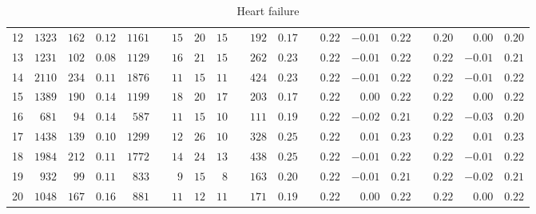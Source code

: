 \documentclass[]{article}\usepackage[]{graphicx}\usepackage[]{color}
\begin{document}
\begin{landscape}
\begin{table}[!tbp]
\begin{center}
\begin{tabular}{lrrrrcrrrcrrcrrrcrrr}
12&$1323$&$162$&$0.12$&$1161$&&$15$&$20$&$15$&&$192$&$0.17$&&$0.22$&$-0.01$&$0.22$&&$0.20$&$ 0.00$&$0.20$\tabularnewline
13&$1231$&$102$&$0.08$&$1129$&&$16$&$21$&$15$&&$262$&$0.23$&&$0.22$&$-0.01$&$0.22$&&$0.22$&$-0.01$&$0.21$\tabularnewline
14&$2110$&$234$&$0.11$&$1876$&&$11$&$15$&$11$&&$424$&$0.23$&&$0.22$&$-0.01$&$0.22$&&$0.22$&$-0.01$&$0.22$\tabularnewline
15&$1389$&$190$&$0.14$&$1199$&&$18$&$20$&$17$&&$203$&$0.17$&&$0.22$&$ 0.00$&$0.22$&&$0.22$&$ 0.00$&$0.22$\tabularnewline
16&$ 681$&$ 94$&$0.14$&$ 587$&&$11$&$15$&$10$&&$111$&$0.19$&&$0.22$&$-0.02$&$0.21$&&$0.22$&$-0.03$&$0.20$\tabularnewline
17&$1438$&$139$&$0.10$&$1299$&&$12$&$26$&$10$&&$328$&$0.25$&&$0.22$&$ 0.01$&$0.23$&&$0.22$&$ 0.01$&$0.23$\tabularnewline
18&$1984$&$212$&$0.11$&$1772$&&$14$&$24$&$13$&&$438$&$0.25$&&$0.22$&$-0.01$&$0.22$&&$0.22$&$-0.01$&$0.22$\tabularnewline
19&$ 932$&$ 99$&$0.11$&$ 833$&&$ 9$&$15$&$ 8$&&$163$&$0.20$&&$0.22$&$-0.01$&$0.21$&&$0.22$&$-0.02$&$0.21$\tabularnewline
20&$1048$&$167$&$0.16$&$ 881$&&$11$&$12$&$11$&&$171$&$0.19$&&$0.22$&$ 0.00$&$0.22$&&$0.22$&$ 0.00$&$0.22$\tabularnewline
\hline
\end{tabular}

\caption{Heart failure\label{round}}\end{center}

\end{table}



\end{landscape}
\end{document}
